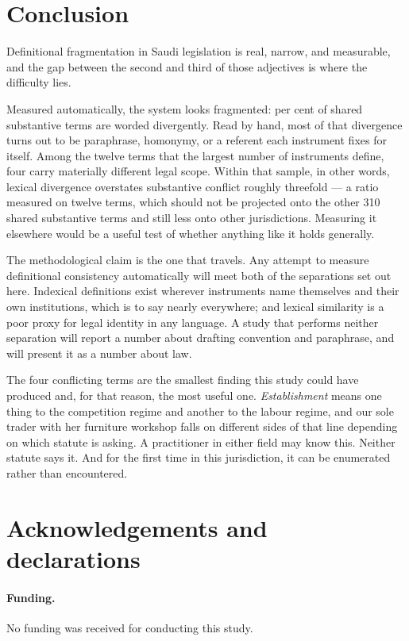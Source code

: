 \documentclass[11pt]{article}
\newif\ifanon
\begin{document}
\section{Conclusion}

Definitional fragmentation in Saudi legislation is real, narrow, and
measurable, and the gap between the second and third of those adjectives is
where the difficulty lies.

Measured automatically, the system looks fragmented: \nDivergentShare{} per cent of shared
substantive terms are worded divergently. Read by hand, most of that
divergence turns out to be paraphrase, homonymy, or a referent each
instrument fixes for itself. Among the twelve terms that the largest number
of instruments define, four carry materially different legal scope. Within
that sample, in other words, lexical divergence overstates substantive
conflict roughly threefold --- a ratio measured on twelve terms, which should
not be projected onto the other 310 shared substantive terms and still less
onto other jurisdictions. Measuring it elsewhere would be a useful test of
whether anything like it holds generally.

The methodological claim is the one that travels. Any attempt to measure
definitional consistency automatically will meet both of the separations set
out here. Indexical definitions exist wherever instruments name themselves
and their own institutions, which is to say nearly everywhere; and lexical
similarity is a poor proxy for legal identity in any language. A study that
performs neither separation will report a number about drafting convention
and paraphrase, and will present it as a number about law.

The four conflicting terms are the smallest finding this study could have
produced and, for that reason, the most useful one. \emph{Establishment}
means one thing to the competition regime and another to the labour regime,
and our sole trader with her furniture workshop falls on different sides of
that line depending on which statute is asking. A practitioner in either
field may know this. Neither statute says it. And for the first time in this
jurisdiction, it can be enumerated rather than encountered.

\ifanon\else
\section*{Acknowledgements and declarations}

\paragraph{Funding.} No funding was received for conducting this study.
\end{document}
